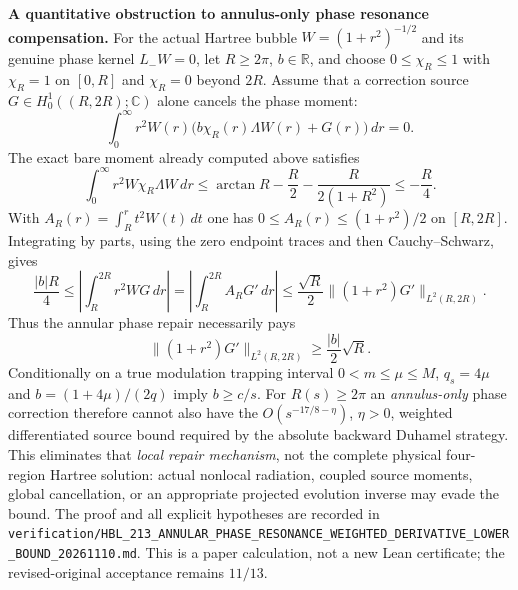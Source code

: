 \documentclass[11pt]{amsart}
\newcommand{\C}{\mathbb C}
\newcommand{\R}{\mathbb R}
\begin{document}
\medskip
\noindent\textbf{A quantitative obstruction to annulus-only phase
resonance compensation.}
For the actual Hartree bubble
$W=(1+r^2)^{-1/2}$ and its genuine phase kernel $L_-W=0$,
let $R\ge2\pi$, $b\in\R$, and choose $0\le\chi_R\le1$
with $\chi_R=1$ on $[0,R]$ and $\chi_R=0$ beyond $2R$.
Assume that a correction source
$G\in H^1_0((R,2R);\C)$ alone cancels the phase moment:
\[
 \int_0^\infty r^2W(r)\bigl(b\chi_R(r)\Lambda W(r)+G(r)\bigr)
 \,dr=0.
\]
The exact bare moment already computed above satisfies
\[
 \int_0^\infty r^2W\chi_R\Lambda W\,dr
 \le\arctan R-\frac R2-\frac{R}{2(1+R^2)}
 \le-\frac R4 .
\]
With $A_R(r)=\int_R^rt^2W(t)\,dt$ one has
$0\le A_R(r)\le(1+r^2)/2$ on $[R,2R]$.
Integrating by parts, using the zero endpoint traces and then
Cauchy--Schwarz, gives
\[
 \frac{|b|R}{4}
 \le\left|\int_R^{2R}r^2WG\,dr\right|
 =\left|\int_R^{2R}A_RG'\,dr\right|
 \le\frac{\sqrt R}{2}
 \|(1+r^2)G'\|_{L^2(R,2R)}.
\]
Thus the annular phase repair necessarily pays
\[
 \boxed{\quad\|(1+r^2)G'\|_{L^2(R,2R)}
 \ge\frac{|b|}{2}\sqrt R.\quad}
\]
Conditionally on a true modulation trapping interval
$0<m\le\mu\le M$, $q_s=4\mu$ and
$b=(1+4\mu)/(2q)$ imply $b\ge c/s$.
For $R(s)\ge2\pi$ an \emph{annulus-only} phase correction
therefore cannot also have the
$O(s^{-17/8-\eta})$, $\eta>0$, weighted differentiated
source bound required by the absolute backward Duhamel strategy.
This eliminates that \emph{local repair mechanism}, not the
complete physical four-region Hartree solution: actual
nonlocal radiation, coupled source moments, global cancellation,
or an appropriate projected evolution inverse may evade the bound.
The proof and all explicit hypotheses are recorded in
\texttt{verification/HBL\_213\_ANNULAR\_PHASE\_RESONANCE\_WEIGHTED\_DERIVATIVE\_LOWER\_BOUND\_20261110.md}.
This is a paper calculation, not a new Lean certificate;
the revised-original acceptance remains $11/13$.
\end{document}

